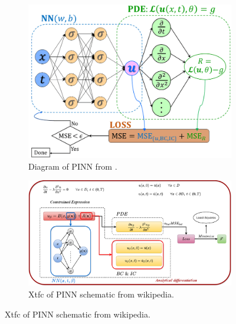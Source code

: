 \documentclass[]{article}
\begin{document}
\begin{figure}
\centering
	\begin{subfigure}{0.49\textwidth}
		\centering
		\includegraphics[width=1\linewidth]{"images/ppinn schematic"}
		\caption[ppinn]{Diagram of PINN from \cite{ppinn}.}
		\label{fig:ppinn-schematic}
	\end{subfigure}
	\begin{subfigure}{0.49\textwidth}
		\centering
		\includegraphics[width=1\linewidth]{images/Xtfc_scheme}
		\caption[pinnwiki]{Xtfc of PINN schematic from wikipedia.}
		\label{fig:xtfcscheme}
	\end{subfigure}
\end{figure}
\end{document}
